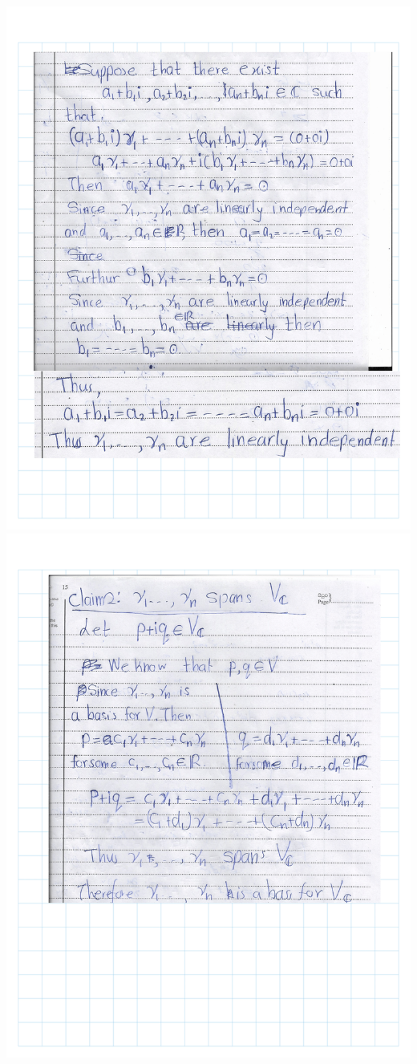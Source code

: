 \documentclass[
]{book}
\theoremstyle{definition}
\theoremstyle{definition}
\theoremstyle{definition}
\theoremstyle{definition}
\theoremstyle{remark}
\begin{document}
\includegraphics{fig/Ex 2B and 2C/EX2B (1).png}
\includegraphics{fig/Ex 2B and 2C/EX2B (2).png}
\end{document}
